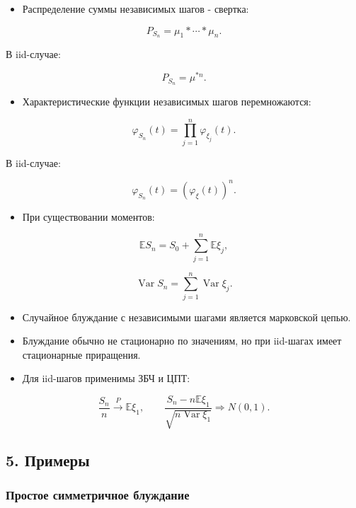 \documentclass[
  11pt,
  a4paper,
]{article}
\providecommand{\tightlist}{%
  \setlength{\itemsep}{0pt}\setlength{\parskip}{0pt}}
\begin{document}
\begin{itemize}
\tightlist
\item
  Распределение суммы независимых шагов - свертка:
\end{itemize}

\[
P_{S_n}=\mu_1*\cdots*\mu_n.
\]

В iid-случае:

\[
P_{S_n}=\mu^{*n}.
\]

\begin{itemize}
\tightlist
\item
  Характеристические функции независимых шагов перемножаются:
\end{itemize}

\[
\varphi_{S_n}(t)=\prod_{j=1}^n\varphi_{\xi_j}(t).
\]

В iid-случае:

\[
\varphi_{S_n}(t)=\left(\varphi_\xi(t)\right)^n.
\]

\begin{itemize}
\tightlist
\item
  При существовании моментов:
\end{itemize}

\[
\mathbb ES_n=S_0+\sum_{j=1}^n\mathbb E\xi_j,
\]

\[
\operatorname{Var}S_n=\sum_{j=1}^n\operatorname{Var}\xi_j.
\]

\begin{itemize}
\tightlist
\item
  Случайное блуждание с независимыми шагами является марковской цепью.
\item
  Блуждание обычно не стационарно по значениям, но при iid-шагах имеет
  стационарные приращения.
\item
  Для iid-шагов применимы ЗБЧ и ЦПТ:
\end{itemize}

\[
\frac{S_n}{n}\xrightarrow{P}\mathbb E\xi_1,
\qquad
\frac{S_n-n\mathbb E\xi_1}{\sqrt{n\operatorname{Var}\xi_1}}
\Rightarrow N(0,1).
\]

\subsection{5. Примеры}\label{ux43fux440ux438ux43cux435ux440ux44b}

\subsubsection{Простое симметричное
блуждание}\label{ux43fux440ux43eux441ux442ux43eux435-ux441ux438ux43cux43cux435ux442ux440ux438ux447ux43dux43eux435-ux431ux43bux443ux436ux434ux430ux43dux438ux435}
\end{document}
